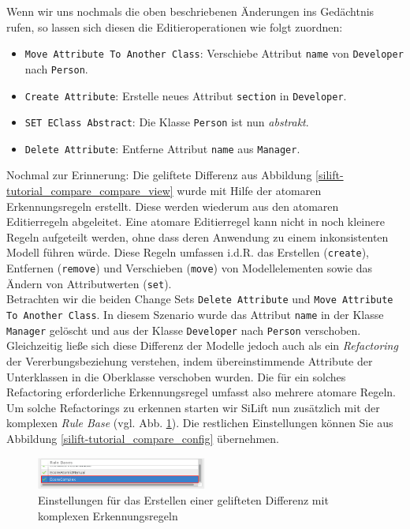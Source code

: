 Wenn wir uns nochmals die oben beschriebenen Änderungen ins Gedächtnis rufen, so lassen sich diesen die Editieroperationen wie folgt zuordnen:

\begin{itemize}
\item \texttt{Move Attribute To Another Class}: Verschiebe Attribut \texttt{name} von \texttt{Developer} nach \texttt{Person}.
\item \texttt{Create Attribute}: Erstelle neues Attribut \texttt{section} in \texttt{Developer}.
\item \texttt{SET EClass Abstract}: Die Klasse \texttt{Person} ist nun \textit{abstrakt}.
\item \texttt{Delete Attribute}: Entferne Attribut \texttt{name} aus \texttt{Manager}.
\end{itemize}

Nochmal zur Erinnerung: Die geliftete Differenz aus Abbildung \ref{silift-tutorial_compare_compare_view} wurde mit Hilfe der atomaren Erkennungsregeln erstellt.
Diese werden wiederum aus den atomaren Editierregeln abgeleitet.
Eine atomare Editierregel kann nicht in noch kleinere Regeln aufgeteilt werden, ohne dass deren Anwendung zu einem inkonsistenten Modell führen würde.
Diese Regeln umfassen i.d.R. das Erstellen (\texttt{create}), Entfernen (\texttt{remove}) und Verschieben (\texttt{move}) von Modellelementen sowie das Ändern von Attributwerten (\texttt{set}).\\
Betrachten wir die beiden Change Sets \texttt{Delete Attribute} und \texttt{Move Attribute To Another Class}.
In diesem Szenario wurde das Attribut \texttt{name} in der Klasse \texttt{Manager} gelöscht und aus der Klasse \texttt{Developer} nach \texttt{Person} verschoben.
Gleichzeitig ließe sich diese Differenz der Modelle jedoch auch als ein \textit{Refactoring} der Vererbungsbeziehung verstehen, indem übereinstimmende Attribute der Unterklassen in die Oberklasse verschoben wurden.
Die für ein solches Refactoring erforderliche Erkennungsregel umfasst also mehrere atomare Regeln.
Um solche Refactorings zu erkennen starten wir SiLift nun zusätzlich mit der komplexen \textit{Rule Base} (vgl. Abb. \ref{silift-tutorial_compare_config_complex}). Die restlichen Einstellungen können Sie aus Abbildung \ref{silift-tutorial_compare_config} übernehmen.

\begin{figure}[h!]
\centering
\includegraphics[width=0.5\textwidth]{lifting/graphics/silift-tutorial_compare_config_complex.png}
\caption{Einstellungen für das Erstellen einer gelifteten Differenz mit komplexen Erkennungsregeln}
\label{silift-tutorial_compare_config_complex}
\end{figure}

